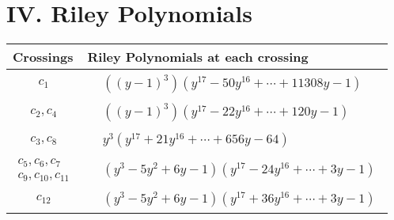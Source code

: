 \documentclass[1p]{elsarticle_modified}
\theoremstyle{definition}
\begin{document}
\centering \section*{ IV. Riley Polynomials}
\begin{tabular}{m{50pt}|m{274pt}}
Crossings & \hspace{64pt}Riley Polynomials at each crossing \\
\hline $$\begin{aligned}c_{1}\end{aligned}$$&$\begin{aligned}
&((y-1)^3)(y^{17}-50 y^{16}+\cdots+11308 y-1)
\end{aligned}$\\
\hline $$\begin{aligned}c_{2},c_{4}\end{aligned}$$&$\begin{aligned}
&((y-1)^3)(y^{17}-22 y^{16}+\cdots+120 y-1)
\end{aligned}$\\
\hline $$\begin{aligned}c_{3},c_{8}\end{aligned}$$&$\begin{aligned}
&y^3(y^{17}+21 y^{16}+\cdots+656 y-64)
\end{aligned}$\\
\hline $$\begin{aligned}c_{5},c_{6},c_{7}\\c_{9},c_{10},c_{11}\end{aligned}$$&$\begin{aligned}
&(y^3-5 y^2+6 y-1)(y^{17}-24 y^{16}+\cdots+3 y-1)
\end{aligned}$\\
\hline $$\begin{aligned}c_{12}\end{aligned}$$&$\begin{aligned}
&(y^3-5 y^2+6 y-1)(y^{17}+36 y^{16}+\cdots+3 y-1)
\end{aligned}$\\
\hline
\end{tabular}
\vskip 2pc
\end{document}

